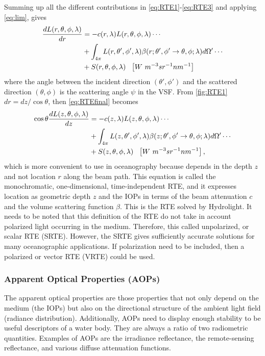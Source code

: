 Summing up all the different contributions in \autoref{eq:RTE1}-\ref{eq:RTE3} and applying \autoref{eq:lim}, gives
\begin{align}\label{eq:RTEfinal}
  \frac{dL(r,\theta,\phi,\lambda)}{dr}&=-c(r,\lambda)L(r,\theta,\phi,\lambda)\cdots \notag \\
  &+\int_{4\pi} L(r,\theta',\phi',\lambda)\beta(r;\theta',\phi' \to \theta,\phi;\lambda)d\Omega'\cdots \notag  \\
  &+S(r,\theta,\phi,\lambda)~~\left[W~m^{-3}sr^{-1}nm^{-1} \right]
\end{align}
where the angle between the incident direction $(\theta',\phi')$ and the scattered direction $(\theta,\phi)$ is the scattering angle $\psi$ in the VSF. From \autoref{fig:RTE1} $dr=dz/\cos{\theta}$, then \autoref{eq:RTEfinal} becomes
\begin{align}\label{eq:RTEfinal2}
  \cos\theta\frac{dL(z,\theta,\phi,\lambda)}{dz}&=-c(z,\lambda)L(z,\theta,\phi,\lambda)\cdots \notag \\
  &+\int_{4\pi} L(z,\theta',\phi',\lambda)\beta(z;\theta',\phi' \to \theta,\phi;\lambda)d\Omega'\cdots \notag  \\
  &+S(z,\theta,\phi,\lambda)~~\left[W~m^{-3}sr^{-1}nm^{-1} \right],
\end{align}
which is more convenient to use in oceanography because depends in the depth $z$ and not location $r$ along the beam path. This equation is called the monochromatic, one-dimensional, time-independent RTE, and it expresses location as geometric depth $z$ and the IOPs in terms of the beam attenuation $c$ and the volume scattering function $\beta$. This is the RTE solved by Hydrolight. It needs to be noted that this definition of the RTE do not take in account polarized light occurring in the medium. Therefore, this called unpolarized, or scalar RTE (SRTE). However, the SRTE gives sufficiently accurate solutions for many oceanographic applications. If polarization need to be included, then a polarized or vector RTE (VRTE) could be used.

\subsubsection*{Apparent Optical Properties (AOPs)}
The apparent optical properties are those properties that not only depend on the medium (the IOPs) but also on the directional structure of the ambient light field (radiance distribution). Additionally, AOPs need to display enough stability to be useful descriptors of a water body. They are always a ratio of two radiometric quantities. Examples of AOPs are the irradiance reflectance, the remote-sensing reflectance, and various diffuse attenuation functions.

